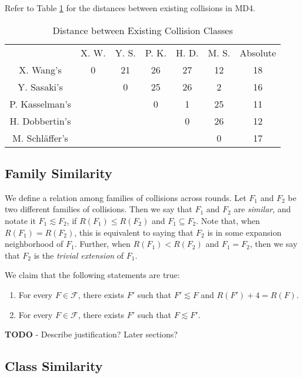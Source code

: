 \documentclass[conference]{IEEEtran}
\begin{document}
Refer to Table \ref{table:distance} for the distances between existing
collisions in MD4.

\begin{table}
    \caption{Distance between Existing Collision Classes}
    \label{table:distance}
    \begin{tabular}{c c c c c c c}
        & X. W. & Y. S. & P. K. & H. D. & M. S. & Absolute \\
        X. Wang's & 0 & 21 & 26 & 27 & 12 & 18 \\
        Y. Sasaki's & & 0 & 25 & 26 & 2 & 16 \\
        P. Kasselman's &  &  & 0 & 1 & 25 & 11 \\
        H. Dobbertin's &  &  &  & 0 & 26 & 12 \\
        M. Schl{\"a}ffer's &  &  &  &  & 0 & 17 \\
    \end{tabular}
\end{table}




\subsection{Family Similarity}
We define a relation among families of collisions across rounds. Let $F_1$ and
$F_2$ be two different families of collisions. Then we say that $F_1$ and $F_2$
are \textit{similar}, and notate it $F_1 \lesssim F_2$, if $R(F_1) \leq R(F_2)$
and $F_1 \subseteq F_2$. Note that, when $R(F_1) = R(F_2)$, this is equivalent
to saying that $F_2$ is in some expansion neighborhood of $F_1$. Further, when
$R(F_1) < R(F_2)$ and $F_1 = F_2$, then we say that $F_2$ is the
\textit{trivial extension} of $F_1$.

We claim that the following statements are true:
\begin{enumerate}
    \item For every $F \in \mathcal{F}$, there exists $F'$ such that
        $F' \lesssim F$ and $R(F') + 4 = R(F)$.
    \item For every $F \in \mathcal{F}$, there exists $F'$ such that
        $F \lesssim F'$.
\end{enumerate}

\textbf{TODO} - Describe justification? Later sections?


\subsection{Class Similarity}
\end{document}
